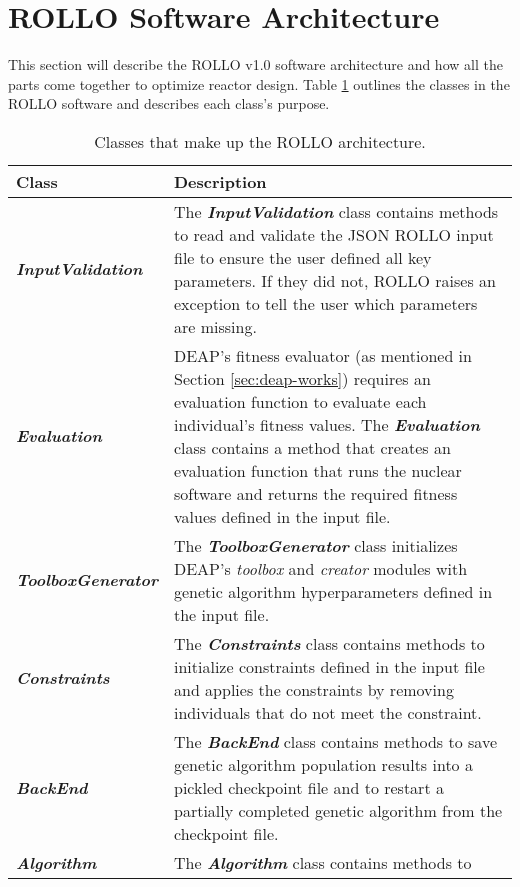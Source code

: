 \section{ROLLO Software Architecture}
This section will describe the \gls{ROLLO} v1.0 software architecture and 
how all the parts come together to optimize reactor design.
Table \ref{tab:rollo-architecture} outlines the classes in the \gls{ROLLO} software 
and describes each class's purpose.
\begin{table}[htbp]
    \centering
    \onehalfspacing
    \caption{Classes that make up the \gls{ROLLO} architecture. }
	\label{tab:rollo-architecture}
    \footnotesize
    \begin{tabular}{l|p{}}
    \hline
    \textbf{Class} & \textbf{Description} \\ \hline
    \textbf{\textit{InputValidation}} & The \textbf{\textit{InputValidation}} class contains methods 
    to read and validate the JSON \gls{ROLLO} input file to 
    ensure the user defined all key parameters. If they did not, \gls{ROLLO} 
    raises an exception to tell the user which parameters are missing. \\
    \hline
    \textbf{\textit{Evaluation}} & \gls{DEAP}'s fitness evaluator (as mentioned in Section 
    \ref{sec:deap-works}) requires an evaluation function to evaluate each 
    individual's fitness values. 
    The \textbf{\textit{Evaluation}} class contains a method that creates an evaluation 
    function that runs the nuclear software and returns the required fitness values
    defined in the input file. \\
    \hline 
    \textbf{\textit{ToolboxGenerator}} & The \textbf{\textit{ToolboxGenerator}} class initializes
    \gls{DEAP}'s \textit{toolbox} and \textit{creator} modules with genetic algorithm 
    hyperparameters defined in the input file.\\
    \hline
    \textbf{\textit{Constraints}} & The \textbf{\textit{Constraints}} class 
    contains methods to initialize constraints defined in the input file 
    and applies the constraints by removing individuals that do not meet the 
    constraint.\\
    \hline 
    \textbf{\textit{BackEnd}} & The \textbf{\textit{BackEnd}} class contains methods to save 
    genetic algorithm population results into a pickled checkpoint file and to 
    restart a partially completed genetic algorithm from the checkpoint file. \\
    \hline
    \textbf{\textit{Algorithm}} & The \textbf{\textit{Algorithm}} class contains methods to 

\end{tabular}
\end{table}
